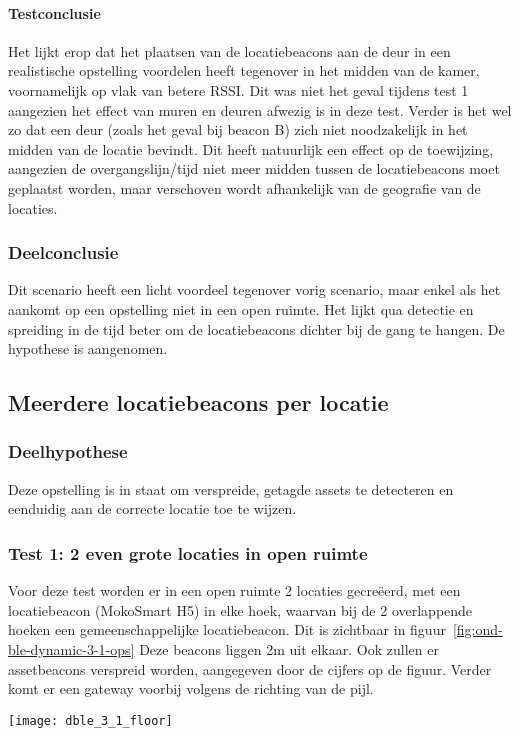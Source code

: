 \paragraph{Testconclusie}
Het lijkt erop dat het plaatsen van de locatiebeacons aan de deur in een realistische opstelling voordelen heeft tegenover in het midden van de kamer, voornamelijk op vlak van betere RSSI. Dit was niet het geval tijdens test 1 aangezien het effect van muren en deuren afwezig is in deze test. Verder is het wel zo dat een deur (zoals het geval bij beacon B) zich niet noodzakelijk in het midden van de locatie bevindt. Dit heeft natuurlijk een effect op de toewijzing, aangezien de overgangslijn/tijd niet meer midden tussen de locatiebeacons moet geplaatst worden, maar verschoven wordt afhankelijk van de geografie van de locaties.

\subsubsection{Deelconclusie}
Dit scenario heeft een licht voordeel tegenover vorig scenario, maar enkel als het aankomt op een opstelling niet in een open ruimte. Het lijkt qua detectie en spreiding in de tijd beter om de locatiebeacons dichter bij de gang te hangen. De hypothese is aangenomen.

\subsection{Meerdere locatiebeacons per locatie}
\label{sec:ond-ble-6}
\subsubsection{Deelhypothese}
Deze opstelling is in staat om verspreide, getagde assets te detecteren en eenduidig aan de correcte locatie toe te wijzen.

\subsubsection{Test 1: 2 even grote locaties in open ruimte}
\label{sec:ond-ble-6-1}
\begin{minipage}{0.55\textwidth}
Voor deze test worden er in een open ruimte 2 locaties gecreëerd, met een locatiebeacon (MokoSmart H5) in elke hoek, waarvan bij de 2 overlappende hoeken een gemeenschappelijke locatiebeacon. Dit is zichtbaar in figuur~\ref{fig:ond-ble-dynamic-3-1-ops} Deze beacons liggen 2m uit elkaar. Ook zullen er assetbeacons verspreid worden, aangegeven door de cijfers op de figuur. Verder komt er een gateway voorbij volgens de richting van de pijl. 
\end{minipage}
\hfill
\begin{minipage}{0.42\textwidth}
	\texttt{[image: dble\_3\_1\_floor]}
	\label{fig:ond-ble-dynamic-3-1-ops}
\end{minipage}

